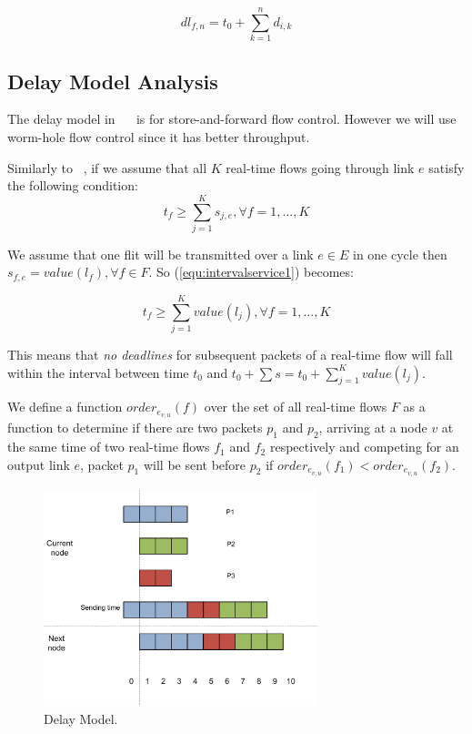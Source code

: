 \documentclass[conference, twocolumn]{IEEEtran}
\theoremstyle{definition}
\begin{document}
\begin{equation}\label{equ:deadline2}
dl_{f,n}=t_0 + \sum_{k=1}^{n}d_{i,k}
\end{equation}

\subsection{Delay Model Analysis}

The delay model in ~\cite{Ferrari90ascheme}~\cite{VermaJitter91} is
for store-and-forward flow control. However we will use worm-hole flow
control since it has better throughput.


Similarly to ~\cite{Ferrari90ascheme}, if we assume that all $K$ 
real-time flows going through link $e$ satisfy the following condition:
\begin{equation}\label{equ:intervalservice1}
t_f \geq \sum_{j=1}^Ks_{j,e}, \forall f = 1,...,K
\end{equation}

We assume that one flit will be transmitted over a link $e \in E$ in one cycle
then $s_{f,e}=value(l_f), \forall f \in F$. So (\ref{equ:intervalservice1})
becomes:

\begin{equation}\label{equ:intervalservice2}
t_f \geq \sum_{j=1}^Kvalue(l_j), \forall f = 1,...,K
\end{equation}

This means that {\em no deadlines} for subsequent packets of a real-time flow
will fall within the interval between time $t_0$ and $t_0 + \sum s = t_0 +
\sum_{j=1}^Kvalue(l_j)$.

We define a function $order_{e_{v,u}}(f)$ over the set of all real-time flows
$F$ as a function to determine if there are two packets $p_1$ and $p_2$, arriving at
a node $v$ at the same time of two real-time flows $f_1$ and $f_2$ respectively
and competing for an output link $e$, packet $p_1$ will be sent before $p_2$ if
$order_{e_{v,u}}(f_1) < order_{e_{v,u}}(f_2)$. 

\begin{figure}[htbp]
\centering
\includegraphics[width=8cm]{pics/DelayModel.png}
\caption[Delays for packets.]
{Delay Model.}\label{fig:DelayModel}
\end{figure}
\end{document}
